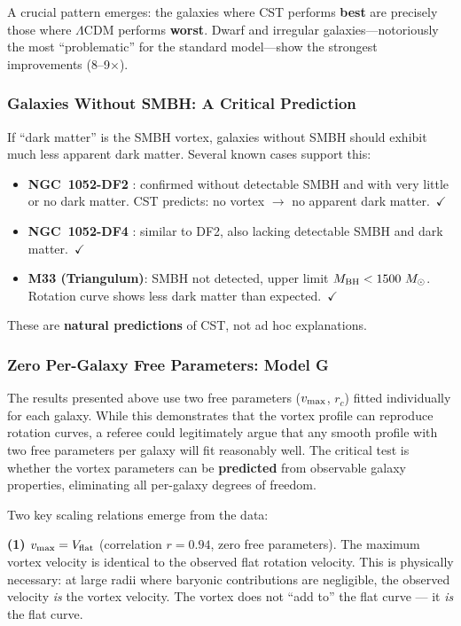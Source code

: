 \documentclass[11pt,a4paper]{article}
\providecommand{\tightlist}{\setlength{\itemsep}{0pt}\setlength{\parskip}{0pt}}
\begin{document}
A crucial pattern emerges: the galaxies where CST performs \textbf{best} are precisely those where $\Lambda$CDM performs \textbf{worst}. Dwarf and irregular galaxies---notoriously the most ``problematic'' for the standard model---show the strongest improvements (8--9$\times$).

\subsubsection{Galaxies Without SMBH: A Critical Prediction}

If ``dark matter'' is the SMBH vortex, galaxies without SMBH should exhibit much less apparent dark matter. Several known cases support this:
\begin{itemize}
\tightlist
\item \textbf{NGC~1052-DF2} \cite{vanDokkum2018}: confirmed without detectable SMBH and with very little or no dark matter. CST predicts: no vortex $\to$ no apparent dark matter.~$\checkmark$
\item \textbf{NGC~1052-DF4} \cite{vanDokkum2019}: similar to DF2, also lacking detectable SMBH and dark matter.~$\checkmark$
\item \textbf{M33 (Triangulum)}: SMBH not detected, upper limit $M_{\rm BH} < 1500~M_\odot$. Rotation curve shows less dark matter than expected.~$\checkmark$
\end{itemize}

These are \textbf{natural predictions} of CST, not ad hoc explanations.

\subsubsection{Zero Per-Galaxy Free Parameters: Model G}\label{sec:modelG}

The results presented above use two free parameters ($v_{\rm max}$, $r_c$) fitted individually for each galaxy. While this demonstrates that the vortex profile can reproduce rotation curves, a referee could legitimately argue that any smooth profile with two free parameters per galaxy will fit reasonably well. The critical test is whether the vortex parameters can be \textbf{predicted} from observable galaxy properties, eliminating all per-galaxy degrees of freedom.

Two key scaling relations emerge from the data:

\textbf{(1) $v_{\rm max} = V_{\rm flat}$} (correlation $r = 0.94$, zero free parameters). The maximum vortex velocity is identical to the observed flat rotation velocity. This is physically necessary: at large radii where baryonic contributions are negligible, the observed velocity \textit{is} the vortex velocity. The vortex does not ``add to'' the flat curve --- it \textit{is} the flat curve.
\end{document}
